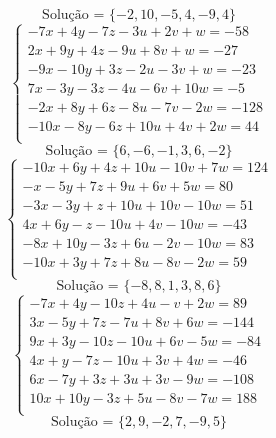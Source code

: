 \documentclass[12pt,oneside,a4paper]{article}
\begin{document}
\begin{equation*}
\text{Solução = }\{-2,10,-5,4,-9,4\}
\end{equation*}
\vspace{\baselineskip}
\begin{equation*}
\begin{cases}
-7x+4y-7z-3u+2v+w=-58 \\
2x+9y+4z-9u+8v+w=-27 \\
-9x-10y+3z-2u-3v+w=-23 \\
7x-3y-3z-4u-6v+10w=-5 \\
-2x+8y+6z-8u-7v-2w=-128 \\
-10x-8y-6z+10u+4v+2w=44 \\
\end{cases}
\end{equation*}
\begin{equation*}
\text{Solução = }\{6,-6,-1,3,6,-2\}
\end{equation*}
\vspace{\baselineskip}
\begin{equation*}
\begin{cases}
-10x+6y+4z+10u-10v+7w=124 \\
-x-5y+7z+9u+6v+5w=80 \\
-3x-3y+z+10u+10v-10w=51 \\
4x+6y-z-10u+4v-10w=-43 \\
-8x+10y-3z+6u-2v-10w=83 \\
-10x+3y+7z+8u-8v-2w=59 \\
\end{cases}
\end{equation*}
\begin{equation*}
\text{Solução = }\{-8,8,1,3,8,6\}
\end{equation*}
\vspace{\baselineskip}
\begin{equation*}
\begin{cases}
-7x+4y-10z+4u-v+2w=89 \\
3x-5y+7z-7u+8v+6w=-144 \\
9x+3y-10z-10u+6v-5w=-84 \\
4x+y-7z-10u+3v+4w=-46 \\
6x-7y+3z+3u+3v-9w=-108 \\
10x+10y-3z+5u-8v-7w=188 \\
\end{cases}
\end{equation*}
\begin{equation*}
\text{Solução = }\{2,9,-2,7,-9,5\}
\end{equation*}
\end{document}
